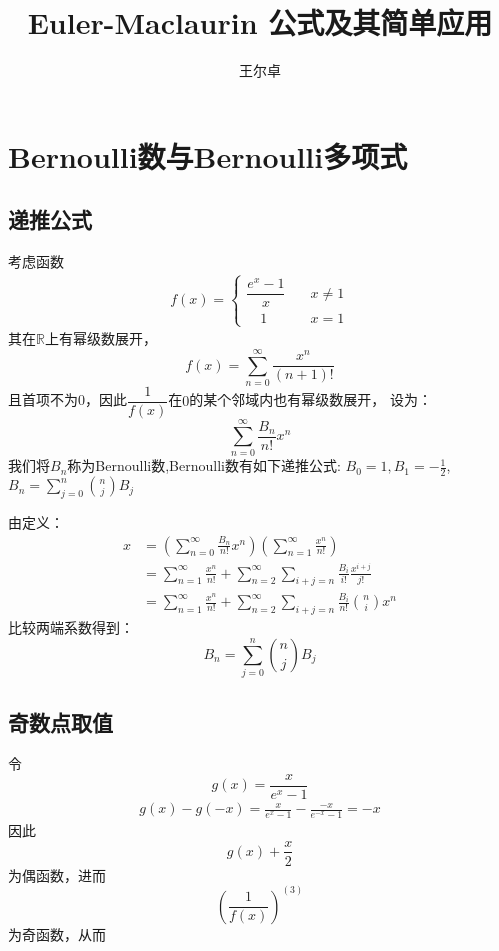 \documentclass[a4paper,12pt]{ctexart}
\title{Euler-Maclaurin 公式及其简单应用}
\date{}
\author{王尔卓}
\newenvironment{prooff}{{\noindent\it\textcolor{black}{Proof}:}\quad}{\par}
\theoremstyle{definition}
\begin{document}
\maketitle
\section{Bernoulli数与Bernoulli多项式}
\subsection{递推公式}
考虑函数
\begin{align*}
    f(x)=\begin{cases}
        \dfrac{e^x-1}{x} & \quad x\neq 1            \\
        \quad 1          & \quad                x=1
    \end{cases}
\end{align*}
其在$\mathbb{R}$上有幂级数展开，
\begin{equation*}
    f(x)=\sum_{n=0}^{\infty}\frac{x^n}{(n+1)!}
\end{equation*}
且首项不为0，因此$\dfrac{1}{f(x)}$在$0$的某个邻域内也有幂级数展开，
设为：
\begin{equation*}
    \sum_{n=0}^{\infty}\frac{B_n}{n!}x^n
\end{equation*}
我们将$B_n$称为Bernoulli数,Bernoulli数有如下递推公式:
$B_0=1,B_1=-\frac{1}{2}$,$B_n=\sum_{j=0}^{n}\binom{n}{j}B_j$

\begin{prooff}
    由定义：
    \begin{align*}
        x & =(\sum_{n=0}^{\infty}\frac{B_n}{n!}x^n)(\sum_{n=1}^{\infty}\frac{x^n}{n!})                         \\
          & =\sum_{n=1}^{\infty}\frac{x^n}{n!}+\sum_{n=2}^{\infty}\sum_{i+j=n}\frac{B_i}{i!}\frac{x^{i+j}}{j!} \\
          & =\sum_{n=1}^{\infty}\frac{x^n}{n!}+\sum_{n=2}^{\infty}\sum_{i+j=n}\frac{B_i}{n!}\binom{n}{i}x^n
    \end{align*}
    比较两端系数得到：
    \begin{equation*}
        B_n=\sum_{j=0}^{n}\binom{n}{j}B_j
    \end{equation*}
\end{prooff}
\subsection{奇数点取值}
令$$g(x)=\frac{x}{e^x-1}$$
\begin{align*}
    g(x)-g(-x)=\frac{x}{e^x-1}-\frac{-x}{e^{-x}-1}=-x
\end{align*}
因此$$g(x)+\frac{x}{2}$$为偶函数，进而$$(\frac{1}{f(x)})^{(3)}$$为奇函数，从而
\end{document}
